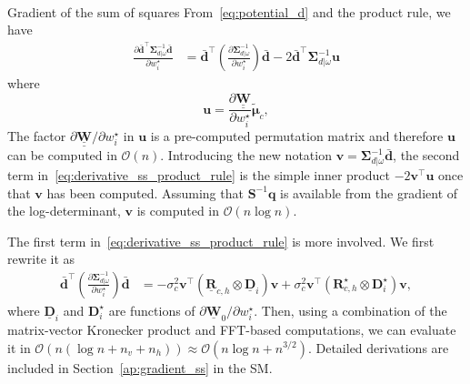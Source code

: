 \documentclass[12pt]{article}
\makeatletter
\let\oldparagraph\paragraph
\renewcommand{\paragraph}{
    \@ifstar
      \xxxParagraphStar
      \xxxParagraphNoStar
  }
\newcommand{\xxxParagraphStar}[1]{\oldparagraph*{#1}\mbox{}}
\newcommand{\xxxParagraphNoStar}[1]{\oldparagraph{#1}\mbox{}}
\newcommand{\mycirc}[1] {\underline{\bm{#1}}}
\newcommand{\mybcirc}[1] {\underline{\underline{\bm{#1}}}}
\makeatother
\begin{document}
\paragraph{Gradient of the sum of squares}\label{sec:gradient_ss}
From~\eqref{eq:potential_d} and the product rule, we have
\begin{equation} \label{eq:derivative_ss_product_rule}
\begin{split}
    \frac{\partial \bar{\bm{d}}^{\top} \bm{\Sigma}_{d|\omega}^{-1} \bar{\bm{d}}}{\partial w_i^\star} 
    &=
    \bar{\bm{d}}^{\top} 
    \left( \frac{\partial \bm{\Sigma}_{d|\omega}^{-1}}{\partial w_i^\star} \right)
    \bar{\bm{d}} 
    - 2 \bar{\bm{d}}^{\top} \bm{\Sigma}_{d|\omega}^{-1} \bm{u}
\end{split}
\end{equation}
where 
\begin{equation}
    \bm{u} = \frac{\partial \mybcirc{W}}{\partial w_i^\star} \tilde{\bm{\mu}}_c,
\end{equation}
The factor $\partial \mybcirc{W} / \partial w_i^\star$ in $\bm{u}$ 
is a pre-computed permutation matrix and therefore $\bm{u}$ can be computed in $\mathcal{O}(n)$.
Introducing the new notation $\bm{v} = \bm{\Sigma}_{d|\omega}^{-1} \bar{\bm{d}}$, the second term in~\eqref{eq:derivative_ss_product_rule} is the simple inner product $-2\bm{v}^\top \bm{u}$ once that $\bm{v}$ has been computed.
Assuming that $\bm{S}^{-1} \bm{q}$ is available from the gradient of the log-determinant, $\bm{v}$ is computed in $\mathcal{O}(n \log n)$. 

The first term in~\eqref{eq:derivative_ss_product_rule} is more involved. We first rewrite it as
\begin{equation} \label{eq:gradient_ss_1}
\begin{split}
    \bar{\bm{d}}^{\top} 
    \left( \frac{\partial \bm{\Sigma}_{d|\omega}^{-1}}{\partial w_i^\star} \right)
    \bar{\bm{d}}  
    &= -\sigma_c^2 \bm{v}^{\top}(\mycirc{R}_{c, h} \otimes \mycirc{D}_{i})
    \bm{v} 
    + \sigma_c^2 \bm{v}^{\top}(\bm{R}_{c, h}^{\star} \otimes \bm{D}_{i}^{\star})
    \bm{v},
\end{split}
\end{equation}
where
$\mycirc{D}_i$
and $\bm{D}_i^\star$ are functions of
$\partial \mycirc{W}_0/\partial w_i^\star$. Then, using a combination of the matrix-vector Kronecker product and FFT-based computations, we can evaluate it in $\mathcal{O}(n(\log n + n_v + n_h)) \approx \mathcal{O}(n\log n + n^{3/2})$.
Detailed derivations are included in Section~\ref{ap:gradient_ss} in the SM.
\end{document}
